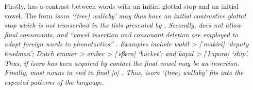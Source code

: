Firstly,  has a contrast between words with an initial
glottal stop and an initial vowel.
The form \it{isoro} ‘(tree) wallaby’ may thus have an initial
contrastive glottal stop which is not transcribed in the lists
presented by \citet[219, 229]{SmitsVoorhoeve1998}.
Secondly,  does not allow final consonants,
and “vowel insertion and consonant deletion are employed to adapt
foreign words to  phonotactics” \citep[6]{deVries2004}.
Examples include  \it{wakil} >  [ˈmakiri] ‘deputy
headman’; Dutch \it{emmer} >  \it{ember} >  [ˈɛβɛro]
‘bucket’; and  \it{kapal} > [ˈkaparo] ‘ship’.
Thus, if \it{isoro} has been acquired by contact the final vowel
may be an insertion.
Finally, most nouns in  end in final [o] \citep[33]{deVries2004}.
Thus, \it{isoro} ‘(tree) wallaby’ fits into the expected patterns of the language.